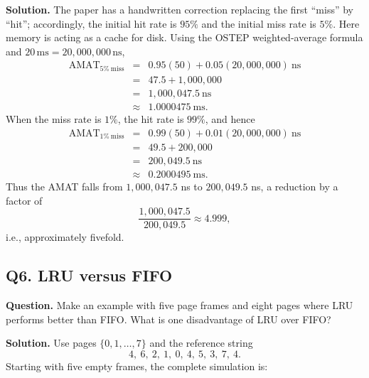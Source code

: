 \textbf{Solution.}
The paper has a handwritten correction replacing the first ``miss'' by
``hit''; accordingly, the initial hit rate is \(95\%\) and the initial miss
rate is \(5\%\). Here memory is acting as a cache for disk. Using the OSTEP
weighted-average formula and
\(20\,\mathrm{ms}=20{,}000{,}000\,\mathrm{ns}\),
\[
\begin{array}{rcl}
\mathrm{AMAT}_{5\%\ \mathrm{miss}}
  &=& 0.95(50)+0.05(20{,}000{,}000)\ \mathrm{ns}\\
  &=&47.5+1{,}000{,}000\\
  &=&1{,}000{,}047.5\ \mathrm{ns}\\
  &\approx& 1.0000475\ \mathrm{ms}.
\end{array}
\]
When the miss rate is \(1\%\), the hit rate is \(99\%\), and hence
\[
\begin{array}{rcl}
\mathrm{AMAT}_{1\%\ \mathrm{miss}}
  &=&0.99(50)+0.01(20{,}000{,}000)\ \mathrm{ns}\\
  &=&49.5+200{,}000\\
  &=&200{,}049.5\ \mathrm{ns}\\
  &\approx&0.2000495\ \mathrm{ms}.
\end{array}
\]
Thus the AMAT falls from \(1{,}000{,}047.5\) ns to \(200{,}049.5\) ns, a
reduction by a factor of
\[
\frac{1{,}000{,}047.5}{200{,}049.5}\approx 4.999,
\]
i.e., approximately fivefold.

\subsection*{Q6. LRU versus FIFO}

\textbf{Question.}
Make an example with five page frames and eight pages where LRU performs
better than FIFO. What is one disadvantage of LRU over FIFO?

\textbf{Solution.}
Use pages \(\{0,1,\ldots,7\}\) and the reference string
\[
4,\ 6,\ 2,\ 1,\ 0,\ 4,\ 5,\ 3,\ 7,\ 4.
\]
Starting with five empty frames, the complete simulation is:

